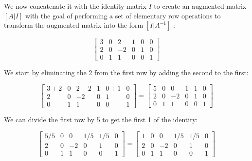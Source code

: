 \documentclass[12pt,letterpaper]{article}
\begin{document}
We now concatenate it with the identity matrix $I$ to create an augmented matrix $[A | I]$ with the goal of performing a set of elementary row operations to transform the augmented matrix into the form $[I|A^{-1}]$ :

\begin{equation}
    \left[\begin{array}{ccc|ccc}
    3 & 0 &  2 & 1 & 0 & 0 \\
    2 & 0 & -2 & 0 & 1 & 0 \\
    0 & 1 &  1 & 0 & 0 & 1
    \end{array}\right]
\end{equation}

We start by eliminating the 2 from the first row by adding the second to the first:

\begin{equation}
    \left[\begin{array}{ccc|ccc}
    3+2 & 0     &  2-2  & 1     & 0+1   & 0 \\
    2   & 0     & -2    & 0     & 1     & 0 \\
    0   & 1     &  1    & 0     & 0     & 1
    \end{array}\right]
    =
    \left[\begin{array}{ccc|ccc}
    5   & 0     &  0    & 1     & 1     & 0 \\
    2   & 0     & -2    & 0     & 1     & 0 \\
    0   & 1     &  1    & 0     & 0     & 1
    \end{array}\right]
\end{equation}

We can divide the first row by 5 to get the first 1 of the identity:

\begin{equation}
    \left[\begin{array}{ccc|ccc}
    5/5 & 0     &  0    & 1/5   & 1/5   & 0 \\
    2   & 0     & -2    & 0     & 1     & 0 \\
    0   & 1     &  1    & 0     & 0     & 1
    \end{array}\right]
    =
    \left[\begin{array}{ccc|ccc}
    1   & 0     &  0    & 1/5   & 1/5   & 0 \\
    2   & 0     & -2    & 0     & 1     & 0 \\
    0   & 1     &  1    & 0     & 0     & 1
    \end{array}\right]
\end{equation}
\end{document}
